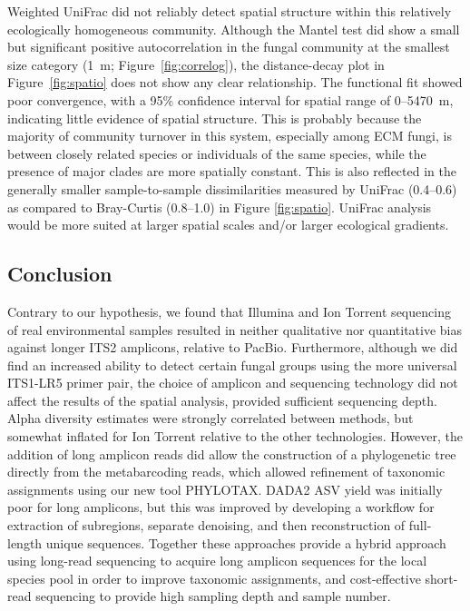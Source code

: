 \documentclass[
  12pt,
]{article}
\begin{document}
Weighted UniFrac did not reliably detect spatial structure within this relatively ecologically homogeneous community.
Although the Mantel test did show a small but significant positive autocorrelation in the fungal community at the smallest size category (1~m; Figure~\ref{fig:correlog}), the distance-decay plot in Figure~\ref{fig:spatio} does not show any clear relationship.
The functional fit showed poor convergence, with a 95\% confidence interval for spatial range of 0--5470~m, indicating little evidence of spatial structure.
This is probably because the majority of community turnover in this system, especially among ECM fungi, is between closely related species or individuals of the same species, while the presence of major clades \autocite[e.g., ECM lineages \textit{sensu}][]{Tedersoo2010} are more spatially constant.
This is also reflected in the generally smaller sample-to-sample dissimilarities measured by UniFrac (0.4--0.6) as compared to Bray-Curtis (0.8--1.0) in Figure \ref{fig:spatio}.
UniFrac analysis would be more suited at larger spatial scales and/or larger ecological gradients.

\hypertarget{conclusion}{%
\subsection{Conclusion}\label{conclusion}}

Contrary to our hypothesis, we found that Illumina and Ion Torrent sequencing of real environmental samples resulted in neither qualitative nor quantitative bias against longer ITS2 amplicons, relative to PacBio.
Furthermore, although we did find an increased ability to detect certain fungal groups using the more universal ITS1-LR5 primer pair, the choice of amplicon and sequencing technology did not affect the results of the spatial analysis, provided sufficient sequencing depth.
Alpha diversity estimates were strongly correlated between methods, but somewhat inflated for Ion Torrent relative to the other technologies.
However, the addition of long amplicon reads did allow the construction of a phylogenetic tree directly from the metabarcoding reads, which allowed refinement of taxonomic assignments using our new tool PHYLOTAX.
DADA2 ASV yield was initially poor for long amplicons, but this was improved by developing a workflow for extraction of subregions, separate denoising, and then reconstruction of full-length unique sequences.
Together these approaches provide a hybrid approach using long-read sequencing to acquire long amplicon sequences for the local species pool in order to improve taxonomic assignments, and cost-effective short-read sequencing to provide high sampling depth and sample number.
\end{document}
